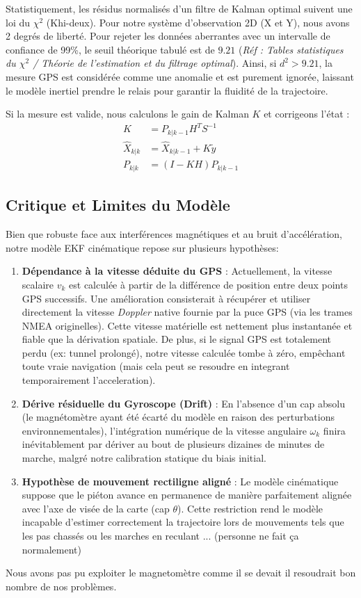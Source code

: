 Statistiquement, les résidus normalisés d'un filtre de Kalman optimal suivent une loi du $\chi^2$ (Khi-deux). Pour notre système d'observation 2D (X et Y), nous avons 2 degrés de liberté.
Pour rejeter les données aberrantes avec un intervalle de confiance de 99\%, le seuil théorique tabulé est de $9.21$ (\textit{Réf : Tables statistiques du $\chi^2$ / Théorie de l'estimation et du filtrage optimal}). 
Ainsi, si $d^2 > 9.21$, la mesure GPS est considérée comme une anomalie et est purement ignorée, laissant le modèle inertiel prendre le relais pour garantir la fluidité de la trajectoire.

Si la mesure est valide, nous calculons le gain de Kalman $K$ et corrigeons l'état :
\begin{align}
   K &= P_{k|k-1} H^T S^{-1} \\
   \hat{X}_{k|k} &= \hat{X}_{k|k-1} + K \tilde{y} \\
   P_{k|k} &= (I - K H) P_{k|k-1}
\end{align}

\subsection{Critique et Limites du Modèle}

Bien que robuste face aux interférences magnétiques et au bruit d'accélération, notre modèle EKF cinématique repose sur plusieurs hypothèses:

\begin{enumerate}
    \item \textbf{Dépendance à la vitesse déduite du GPS} : Actuellement, la vitesse scalaire $v_k$ est calculée à partir de la différence de position entre deux points GPS successifs. Une amélioration  consisterait à récupérer et utiliser directement la vitesse \textit{Doppler} native fournie par la puce GPS (via les trames NMEA originelles). Cette vitesse matérielle est nettement plus instantanée et fiable que la dérivation spatiale. De plus, si le signal GPS est totalement perdu (ex: tunnel prolongé), notre vitesse calculée tombe à zéro, empêchant toute vraie navigation (mais cela peut se resoudre en integrant temporairement l'acceleration).
    \item \textbf{Dérive résiduelle du Gyroscope (Drift)} : En l'absence d'un cap absolu (le magnétomètre ayant été écarté du modèle en raison des perturbations environnementales), l'intégration numérique de la vitesse angulaire $\omega_k$ finira inévitablement par dériver au bout de plusieurs dizaines de minutes de marche, malgré notre calibration statique du biais initial.
    \item \textbf{Hypothèse de mouvement rectiligne aligné} : Le modèle cinématique suppose que le piéton avance en permanence de manière parfaitement alignée avec l'axe de visée de la carte (cap $\theta$). Cette restriction rend le modèle incapable d'estimer correctement la trajectoire lors de mouvements tels que les pas chassés ou les marches en reculant ... (personne ne fait ça normalement)
\end{enumerate}

Nous avons pas pu exploiter le magnetomètre comme il se devait il resoudrait bon nombre de nos problèmes.